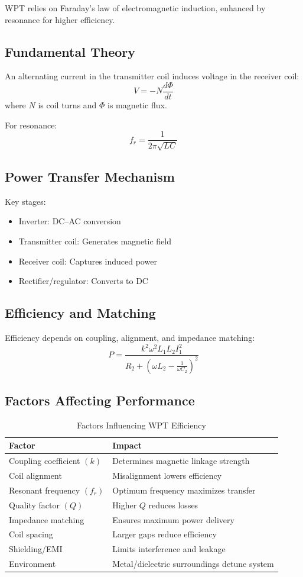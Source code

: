 \documentclass[12pt,a4paper]{report}
\begin{document}
\quad WPT relies on Faraday’s law of electromagnetic induction, enhanced by resonance for higher efficiency.

\subsection{Fundamental Theory}
An alternating current in the transmitter coil induces voltage in the receiver coil:\cite{erickson2020resonant}
\[
V = -N \frac{d\Phi}{dt}
\]
where $N$ is coil turns and $\Phi$ is magnetic flux.

For resonance:
\[
f_r = \frac{1}{2\pi\sqrt{LC}}
\]
\subsection{Power Transfer Mechanism}
Key stages:
\begin{itemize}
    \item Inverter: DC–AC conversion
    \item Transmitter coil: Generates magnetic field
    \item Receiver coil: Captures induced power
    \item Rectifier/regulator: Converts to DC
\end{itemize}

\subsection{Efficiency and Matching}
Efficiency depends on coupling, alignment, and impedance matching:
\[
P = \frac{k^2 \omega^2 L_1 L_2 I_1^2}{R_2 + \left(\omega L_2 - \tfrac{1}{\omega C_2}\right)^2}
\]

\subsection{Factors Affecting Performance\cite{li2022singleended}\cite{bertolini2021frequency}\cite{erickson2020resonant}}
\begin{table}[H]
\centering
\renewcommand{\arraystretch}{1.2}
\begin{tabular}{|p{5cm}|p{10cm}|}
\hline
\textbf{Factor} & \textbf{Impact} \\
\hline
Coupling coefficient $(k)$ & Determines magnetic linkage strength \\
\hline
Coil alignment & Misalignment lowers efficiency \\
\hline
Resonant frequency $(f_r)$ & Optimum frequency maximizes transfer \\
\hline
Quality factor $(Q)$ & Higher $Q$ reduces losses \\
\hline
Impedance matching & Ensures maximum power delivery \\
\hline
Coil spacing & Larger gaps reduce efficiency \\
\hline
Shielding/EMI & Limits interference and leakage \\
\hline
Environment & Metal/dielectric surroundings detune system \\
\hline
\end{tabular}
\caption{Factors Influencing WPT Efficiency}
\end{table}
\end{document}
